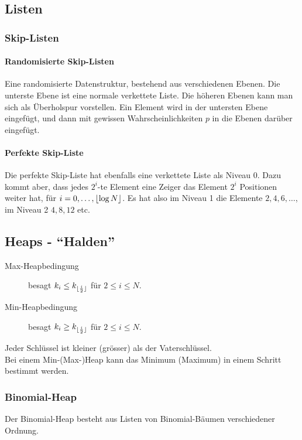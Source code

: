 \documentclass[a4paper, 9pt, DIV=20]{scrartcl}
\DeclarePairedDelimiter{\floor}{\lfloor}{\rfloor}
\begin{document}
\subsection{Listen}

\subsubsection{Skip-Listen}
\paragraph{Randomisierte Skip-Listen}
Eine randomisierte Datenstruktur, bestehend aus verschiedenen Ebenen. Die unterste Ebene ist eine normale verkettete Liste. Die höheren Ebenen kann man sich als Überholspur vorstellen. Ein Element wird in der untersten Ebene eingefügt, und dann mit gewissen Wahrscheinlichkeiten $p$ in die Ebenen darüber eingefügt.
\paragraph{Perfekte Skip-Liste}
Die perfekte Skip-Liste hat ebenfalls eine verkettete Liste als Niveau 0. Dazu kommt aber, dass jedes $2^{i}$-te Element eine Zeiger das Element $2^{i}$ Positionen weiter hat, für $i=0,\dots,\floor{\log{N}}$. Es hat also im Niveau 1 die Elemente $2,4,6,\dots$, im Niveau 2 $4, 8, 12$ etc.


\subsection{Heaps - ``Halden''}
\begin{description}
\item[Max-Heapbedingung] besagt $k_{i}\leq k_{\floor{\frac{i}{2}}}$ für $2 \leq i \leq N$.
\item[Min-Heapbedingung] besagt $k_{i}\geq k_{\floor{\frac{i}{2}}}$ für $2 \leq i \leq N$.
\end{description}
Jeder Schlüssel ist kleiner (grösser) als der Vaterschlüssel. \\
Bei einem Min-(Max-)Heap kann das Minimum (Maximum) in einem Schritt bestimmt werden.

\subsubsection{Binomial-Heap}
Der Binomial-Heap besteht aus Listen von Binomial-Bäumen verschiedener Ordnung. 
\end{document}
